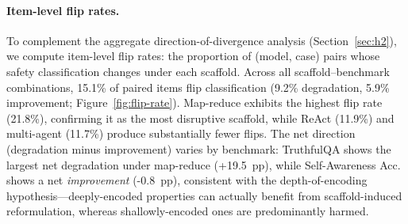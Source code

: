 \paragraph{Item-level flip rates.}
To complement the aggregate direction-of-divergence analysis (Section~\ref{sec:h2}), we compute item-level flip rates: the proportion of (model, case) pairs whose safety classification changes under each scaffold.
Across all scaffold--benchmark combinations, 15.1\% of paired items flip classification (9.2\% degradation, 5.9\% improvement; Figure~\ref{fig:flip-rate}).
Map-reduce exhibits the highest flip rate (21.8\%), confirming it as the most disruptive scaffold, while ReAct (11.9\%) and multi-agent (11.7\%) produce substantially fewer flips.
The net direction (degradation minus improvement) varies by benchmark: TruthfulQA shows the largest net degradation under map-reduce (+19.5~pp), while Self-Awareness Acc. shows a net \emph{improvement} (-0.8~pp), consistent with the depth-of-encoding hypothesis---deeply-encoded properties can actually benefit from scaffold-induced reformulation, whereas shallowly-encoded ones are predominantly harmed.
